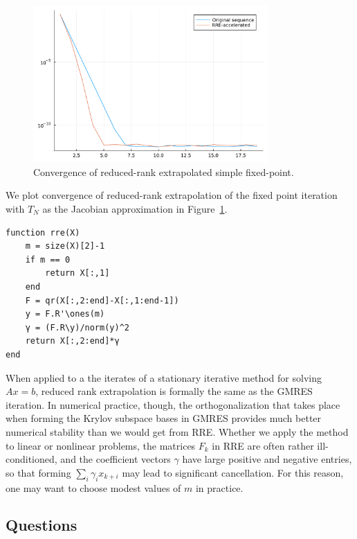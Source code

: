 \documentclass[12pt, leqno]{article} %
\begin{document}
\begin{figure}
\begin{center}
  \includegraphics[width=0.8\textwidth]{fig/2023-04-14-rre.pdf}
\end{center}
\caption{Convergence of reduced-rank extrapolated simple fixed-point.}
\label{fig:rre-cvg}
\end{figure}

We plot convergence of reduced-rank extrapolation of the fixed point
iteration with $T_N$ as the Jacobian approximation in
Figure~\ref{fig:rre-cvg}.

\begin{verbatim}
function rre(X)
    m = size(X)[2]-1
    if m == 0
        return X[:,1]
    end
    F = qr(X[:,2:end]-X[:,1:end-1])
    y = F.R'\ones(m)
    γ = (F.R\y)/norm(y)^2
    return X[:,2:end]*γ
end
\end{verbatim}

When applied to a the iterates of a stationary iterative method for
solving \(Ax = b\), reduced rank extrapolation is formally the same as
the GMRES iteration. In numerical practice, though, the
orthogonalization that takes place when forming the Krylov subspace
bases in GMRES provides much better numerical stability than we would
get from RRE. Whether we apply the method to linear or nonlinear
problems, the matrices \(F_k\) in RRE are often rather ill-conditioned,
and the coefficient vectors \(\gamma\) have large positive and negative
entries, so that forming \(\sum_i \gamma_i x_{k+i}\) may lead to
significant cancellation. For this reason, one may want to choose modest
values of \(m\) in practice.

\subsection{Questions}
\end{document}
